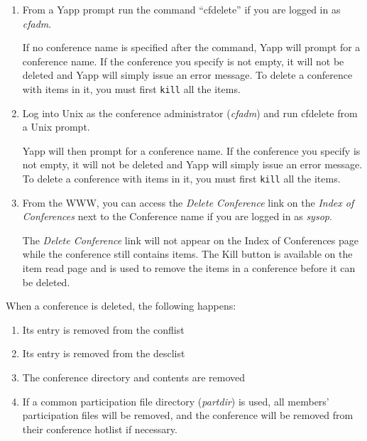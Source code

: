 \documentclass[twoside]{report}
\begin{document}
      \begin{enumerate}
         \item From a Yapp prompt run the command ``cfdelete'' 
            if you are logged in as {\em cfadm}.

            If no conference name is specified after the command, Yapp will
            prompt for a conference name.  If the conference you specify is not 
            empty, it will not be deleted and Yapp will simply issue an error
            message.  To delete a conference with items in it, you must first 
            {\tt kill} all the items.

         \item Log into Unix as the conference administrator ({\em cfadm}) and 
            run cfdelete from a Unix prompt.

            Yapp will then prompt for a conference name.  If the conference
            you specify is not empty, it will not be deleted and Yapp will 
            simply issue an error message.  To delete a conference with items 
            in it, you must first {\tt kill} all the items.
   
         \item From the WWW, you can access the {\em Delete Conference} link on 
            the {\em Index of Conferences} next to the Conference name if you
            are logged in as {\em sysop}.
   
            The {\em Delete Conference} link will not appear on the Index of 
            Conferences page while the conference still contains items.  The 
            Kill button is available on the item read page and is used to remove 
            the items in a conference before it can be deleted.
      \end{enumerate}
   
\renewcommand {\theenumi}{\arabic{enumi}}
\renewcommand {\labelenumi}{\theenumi.}

      When a conference is deleted, the following happens:
      \begin{enumerate}
      \item Its entry is removed from the conflist
      \item Its entry is removed from the desclist
      \item The conference directory and contents are removed 
      \item If a common participation file directory 
            ({\em partdir}) is used, all members'
            participation files will be removed, and the conference will be
            removed from their conference hotlist if necessary.
      \end{enumerate}
   
\end{document}
